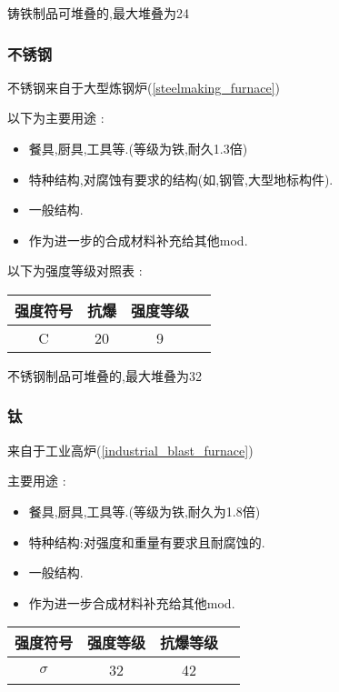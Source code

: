 {{{          铸铁制品可堆叠的,最大堆叠为24
      }

      \subsubsection{不锈钢}{
          不锈钢来自于大型炼钢炉({\ref{steelmaking_furnace}})

          以下为主要用途 :
          \begin{itemize}[itemsep=1pt]
              \item 餐具,厨具,工具等.(等级为铁,耐久1.3倍)
              \item 特种结构,对腐蚀有要求的结构(如,钢管,大型地标构件).
              \item 一般结构.
              \item 作为进一步的合成材料补充给其他mod.
          \end{itemize}

          以下为强度等级对照表 :

          \begin{center}
              \begin{tabular}{|c|c|c|c|}
                  \hline
                  强度符号 & 抗爆   & 强度等级 \\
                  \hline
                  C        & 20 & 9      \\
                  \hline
              \end{tabular}
          \end{center}

          不锈钢制品可堆叠的,最大堆叠为32
      }

      \subsubsection{钛}{
          来自于工业高炉({\ref{industrial_blast_furnace}})

          主要用途 :
          \begin{itemize}[itemsep=1pt]
              \item 餐具,厨具,工具等.(等级为铁,耐久为1.8倍)
              \item 特种结构:对强度和重量有要求且耐腐蚀的.
              \item 一般结构.
              \item 作为进一步合成材料补充给其他mod.
          \end{itemize}

          \begin{center}
              \begin{tabular}{|c|c|c|c|}
                  \hline
                  强度符号 & 强度等级 & 抗爆等级 \\
                  \hline
                  $\sigma$ & 32      & 42       \\
                  \hline
              \end{tabular}
          \end{center}

}}}
